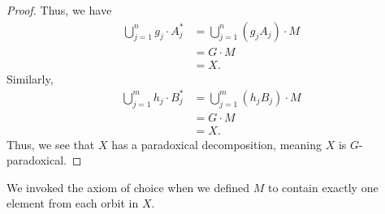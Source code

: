 \documentclass[12pt]{mypackage}
\begin{document}
\begin{proof}
  Thus, we have
  \begin{align*}
    \bigcup_{j=1}^{n}g_j\cdot A_j^{\ast} &= \bigcup_{j=1}^{n} \left(g_jA_j\right)\cdot M\\
                                         &= G\cdot M\\
                                         &= X.
  \end{align*}
  Similarly,
  \begin{align*}
    \bigcup_{j=1}^{m}h_j\cdot B_j^{\ast} &= \bigcup_{j=1}^{m}\left(h_jB_j\right)\cdot M\\
                                         &= G\cdot M\\
                                         &= X.
  \end{align*}
  Thus, we see that $X$ has a paradoxical decomposition, meaning $X$ is $G$-paradoxical.
\end{proof}
\begin{note}
  We invoked the axiom of choice when we defined $M$ to contain exactly one element from each orbit in $X$.
\end{note}
\end{document}
